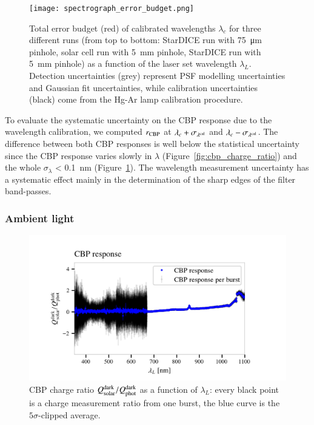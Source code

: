 \begin{figure}[!h]
\centering
\texttt{[image: spectrograph\_error\_budget.png]}
\caption{Total error budget (red) of calibrated wavelengths $\lambda_c$ for three different runs (from top to bottom: StarDICE run with \SI{75}{\um} pinhole, solar cell run with \SI{5}{mm} pinhole, StarDICE run with \SI{5}{mm} pinhole) as a function of the laser set wavelength $\lambda_L$. Detection uncertainties (grey) represent PSF modelling uncertainties and Gaussian fit uncertainties, while calibration uncertainties (black) come from the Hg-Ar lamp calibration procedure. }\label{fig:wavelength_error_budget}
\end{figure}

To evaluate the systematic uncertainty on the CBP response due to the wavelength calibration, we computed $r_{\rm CBP}$ at $\lambda_c+\sigma_{\lambda^{\rm cal}}$ and $\lambda_c-\sigma_{\lambda^{\rm cal}}$. The difference between both CBP responses is well below the statistical uncertainty since the CBP response varies slowly in $\lambda$ (Figure~\ref{fig:cbp_charge_ratio}) and the whole $\sigma_\lambda$ < \SI{0.1}{\nano\meter} (Figure~\ref{fig:wavelength_error_budget}). The wavelength measurement uncertainty has a systematic effect mainly in the determination of the sharp edges of the filter band-passes.



\subsubsection{Ambient light}\label{sec:sc_linearity}

\begin{figure}[h]
    \centering
    \includegraphics[width=\columnwidth]{fig/sc_dark_qswMAX.png}
    \caption{CBP charge ratio $Q_{\mathrm{solar}}^{\rm dark}/Q_{\mathrm{phot}}^{\rm dark}$ as a function of $\lambda_L$: every black point is a charge measurement ratio from one burst, the blue curve is the $5\sigma$-clipped average.}
    \label{fig:sc_dark}
\end{figure}

